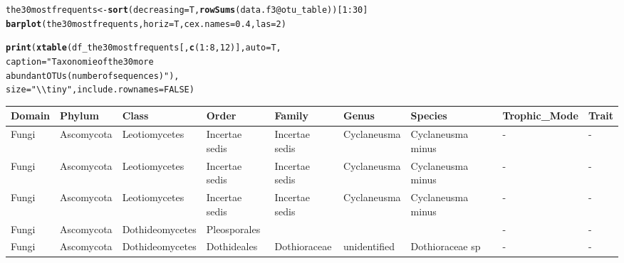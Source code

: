 \documentclass[12pt]{article}\usepackage[]{graphicx}\usepackage[]{color}
\makeatletter
\newcommand{\hlnum}[1]{\textcolor[rgb]{0.686,0.059,0.569}{#1}}%
\newcommand{\hlstr}[1]{\textcolor[rgb]{0.192,0.494,0.8}{#1}}%
\newcommand{\hlopt}[1]{\textcolor[rgb]{0,0,0}{#1}}%
\newcommand{\hlstd}[1]{\textcolor[rgb]{0.345,0.345,0.345}{#1}}%
\newcommand{\hlkwb}[1]{\textcolor[rgb]{0.69,0.353,0.396}{#1}}%
\newcommand{\hlkwc}[1]{\textcolor[rgb]{0.333,0.667,0.333}{#1}}%
\newcommand{\hlkwd}[1]{\textcolor[rgb]{0.737,0.353,0.396}{\textbf{#1}}}%
\newenvironment{kframe}{%
 \def\at@end@of@kframe{}%
 \ifinner\ifhmode%
  \def\at@end@of@kframe{\end{minipage}}%
  \begin{minipage}{\columnwidth}%
 \fi\fi%
 \def\FrameCommand##1{\hskip\@totalleftmargin \hskip-\fboxsep
 \colorbox{shadecolor}{##1}\hskip-\fboxsep
     \hskip-\linewidth \hskip-\@totalleftmargin \hskip\columnwidth}%
 \MakeFramed {\advance\hsize-\width
   \@totalleftmargin\z@ \linewidth\hsize
   \@setminipage}}%
 {\par\unskip\endMakeFramed%
 \at@end@of@kframe}
\newenvironment{knitrout}{}{} %
\numberwithin{figure}{section}
\makeatother
\begin{document}
\begin{knitrout}\small
{}\color{fgcolor}\begin{kframe}
\begin{alltt}
\hlstd{the30mostfrequents} \hlkwb{<-} \hlkwd{sort}\hlstd{(}\hlkwc{decreasing} \hlstd{= T,} \hlkwd{rowSums}\hlstd{(data.f3}\hlopt{@}\hlkwc{otu_table}\hlstd{))[}\hlnum{1}\hlopt{:}\hlnum{30}\hlstd{]}
\hlkwd{barplot}\hlstd{(the30mostfrequents,} \hlkwc{horiz} \hlstd{= T,} \hlkwc{cex.names} \hlstd{=} \hlnum{0.4}\hlstd{,} \hlkwc{las} \hlstd{=} \hlnum{2}\hlstd{)}
\end{alltt}
\end{kframe}
\end{knitrout}



\begin{landscape}
\begin{kframe}
\begin{alltt}
\hlkwd{print}\hlstd{(}\hlkwd{xtable}\hlstd{(df_the30mostfrequents[,} \hlkwd{c}\hlstd{(}\hlnum{1}\hlopt{:}\hlnum{8}\hlstd{,} \hlnum{12}\hlstd{)],} \hlkwc{auto} \hlstd{= T,}
             \hlkwc{caption} \hlstd{=} \hlstr{"Taxonomie of the 30 more
             abundant OTUs (number of sequences)"}\hlstd{),}
      \hlkwc{size} \hlstd{=} \hlstr{"\textbackslash{}\textbackslash{}tiny"}\hlstd{,} \hlkwc{include.rownames} \hlstd{=} \hlnum{FALSE}\hlstd{)}
\end{alltt}
\end{kframe}%
\begin{table}[ht]
\centering
\begingroup\tiny
\begin{tabular}{lllllllll}
  \hline
Domain & Phylum & Class & Order & Family & Genus & Species & Trophic\_Mode & Trait \\ 
  \hline
Fungi & Ascomycota & Leotiomycetes & Incertae sedis & Incertae sedis & Cyclaneusma & Cyclaneusma minus & - & - \\ 
  Fungi & Ascomycota & Leotiomycetes & Incertae sedis & Incertae sedis & Cyclaneusma & Cyclaneusma minus & - & - \\ 
  Fungi & Ascomycota & Leotiomycetes & Incertae sedis & Incertae sedis & Cyclaneusma & Cyclaneusma minus & - & - \\ 
  Fungi & Ascomycota & Dothideomycetes & Pleosporales &  &  &  & - & - \\ 
  Fungi & Ascomycota & Dothideomycetes & Dothideales & Dothioraceae & unidentified & Dothioraceae sp & - & - \\ 

\end{tabular}
\end{table}
\end{landscape}
\end{document}
